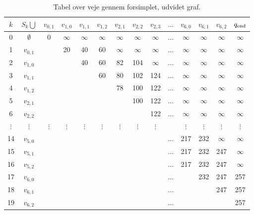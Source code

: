\begin{table}[H]
\centering
\begin{tabular}{|c|c|c|c|c|c|c|c|c|c|c|c|c|c|} 
\hline
$k$ & $S_k \bigcup$ & $v_{0,1}$ & $v_{1,0}$ & $v_{1,1}$ & $v_{1,2}$ & $v_{2,1}$ & $v_{2,2}$ & $v_{2,3}$ & $\ldots$ & $v_{6,0}$ & $v_{6,1}$ & $v_{6,2}$ & $q_{\textrm{end}}$ \\
\hline
0 & $\emptyset$ & 0 & $\infty$ & $\infty$ & $\infty$ & $\infty$ & $\infty$ & $\infty$ & $\ldots$ & $\infty$ & $\infty$ & $\infty$ & $\infty$ \\ 
1 & $v_{0,1}$ & & 20 & 40 & 60 & $\infty$ & $\infty$ & $\infty$ & $\ldots$ & $\infty$ & $\infty$ & $\infty$ & $\infty$\\ 
2 & $v_{1,0}$ & & & 40 & 60 & 82 & 104 & $\infty$ & $\ldots$ & $\infty$ & $\infty$ & $\infty$ & $\infty$\\ 
3 & $v_{1,1}$ & & & & 60 & 80 & 102 & 124 & $\ldots$ & $\infty$ & $\infty$ & $\infty$ & $\infty$\\
4 & $v_{1,2}$ & & & & & 78 & 100 & 122 & $\ldots$ & $\infty$ & $\infty$ & $\infty$ & $\infty$\\ 
5 & $v_{2,1}$ & & & & & & 100 & 122 & $\ldots$ & $\infty$ & $\infty$ & $\infty$ & $\infty$\\ 
6 & $v_{2,2}$ & & & & & & & 122 & $\ldots$ & $\infty$ & $\infty$ & $\infty$ & $\infty$\\  
$\vdots$ & $\vdots$ & $\vdots$ & $\vdots$ & $\vdots$ & $\vdots$ & $\vdots$ & $\vdots$ & $\vdots$ &  & $\vdots$ & $\vdots$ & $\vdots$ & $\vdots$\\ 
14 & $v_{5,0}$ &  &  &  &  &  &  &  & $\ldots$ & 217 & 232 & $\infty$ & $\infty$\\ 
15 & $v_{5,1}$ &  &  &  &  &  &  &  & $\ldots$ & 217 & 232 & 247 & $\infty$\\ 
16 & $v_{5,2}$ &  &  &  &  &  &  &  & $\ldots$ & 217 & 232 & 247 & $\infty$\\ 
17 & $v_{6,0}$ &  &  &  &  &  &  &  & $\ldots$ &  & 232 & 247 & 257\\ 
18 & $v_{6,1}$ &  &  &  &  &  &  &  & $\ldots$ &  &  & 247 & 257\\ 
19 & $v_{6,2}$ &  &  &  &  &  &  &  & $\ldots$ &  &  &  & 257\\ 
\hline
\end{tabular}
\caption{Tabel over veje gennem forsimplet, udvidet graf.}
\label{table:forsimplet_udvidet_graf}
\end{table}